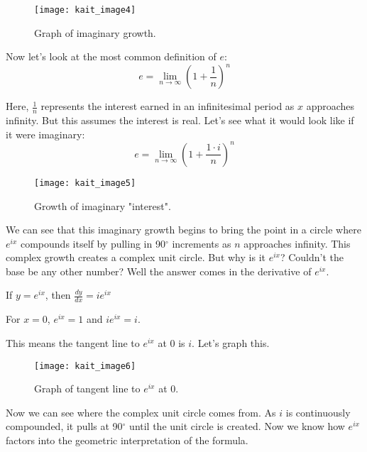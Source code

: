 \renewcommand{\thefigure}{4}
\begin{figure}[h]
  \begin{center}
    \texttt{[image: kait\_image4]}
  \end{center}
  \caption{Graph of imaginary growth.}
  \label{fig:4}
\end{figure}

Now let’s look at the most common definition of $e$:
\[e=\lim_{n\to\infty} (1+\frac{1}{n})^n\]

Here, $\frac{1}{n}$ represents the interest earned in an infinitesimal period as $x$ approaches infinity. But this assumes the interest is real. Let’s see what it would look like if it were imaginary:
\[e=\lim_{n\to\infty} (1+\frac{1 \cdot i}{n})^n\]

\renewcommand{\thefigure}{5}
\begin{figure}[h]
  \begin{center}
    \texttt{[image: kait\_image5]}
  \end{center}
  \caption{Growth of imaginary "interest".}
  \label{fig:5}
\end{figure}

We can see that this imaginary growth begins to bring the point in a circle where $e^{ix}$ compounds itself by pulling in 90$^{\circ}$ increments as $n$ approaches infinity. This complex growth creates a complex unit circle. But why is it $e^{ix}$? Couldn’t the base be any other number? Well the answer comes in the derivative of $e^{ix}$.
\begin{center}
If $y=e^{ix}$, then $\frac{dy}{dx}=ie^{ix}$

For $x=0$, $e^{ix}=1$ and $ie^{ix}=i$.
\end{center}

This means the tangent line to $e^{ix}$ at $0$ is $i$. Let’s graph this. 

\renewcommand{\thefigure}{6}
\begin{figure}[h]
  \begin{center}
    \texttt{[image: kait\_image6]}
  \end{center}
  \caption{Graph of tangent line to $e^{ix}$ at $0$.}
  \label{fig:6}
\end{figure}

Now we can see where the complex unit circle comes from. As $i$ is continuously compounded, it pulls at 90$^{\circ}$ until the unit circle is created. Now we know how $e^{ix}$ factors into the geometric interpretation of the formula. 

